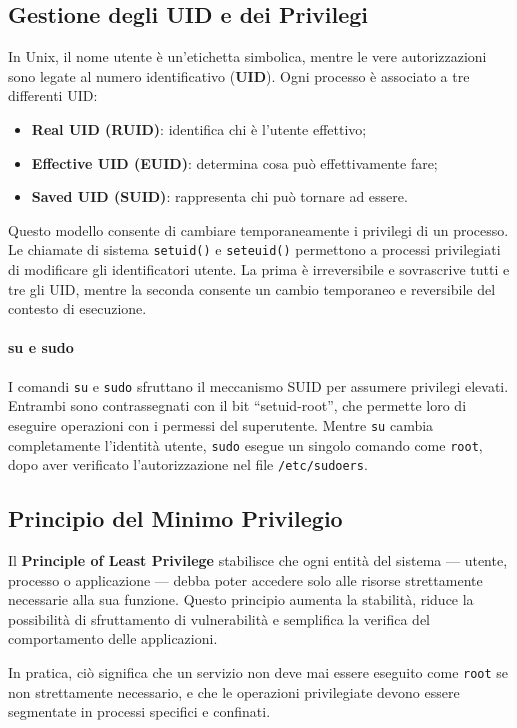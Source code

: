 \subsection{Gestione degli UID e dei Privilegi}
In Unix, il nome utente è un’etichetta simbolica, mentre le vere autorizzazioni sono legate al numero identificativo (\textbf{UID}).
Ogni processo è associato a tre differenti UID:
\begin{itemize}
  \item \textbf{Real UID (RUID)}: identifica chi è l’utente effettivo;
  \item \textbf{Effective UID (EUID)}: determina cosa può effettivamente fare;
  \item \textbf{Saved UID (SUID)}: rappresenta chi può tornare ad essere.
\end{itemize}

Questo modello consente di cambiare temporaneamente i privilegi di un processo.
Le chiamate di sistema \texttt{setuid()} e \texttt{seteuid()} permettono a processi privilegiati di modificare gli identificatori utente.
La prima è irreversibile e sovrascrive tutti e tre gli UID, mentre la seconda consente un cambio temporaneo e reversibile del contesto di esecuzione.

\paragraph{su e sudo}
I comandi \texttt{su} e \texttt{sudo} sfruttano il meccanismo SUID per assumere privilegi elevati.
Entrambi sono contrassegnati con il bit “setuid-root”, che permette loro di eseguire operazioni con i permessi del superutente.
Mentre \texttt{su} cambia completamente l’identità utente, \texttt{sudo} esegue un singolo comando come \texttt{root}, dopo aver verificato l’autorizzazione nel file \texttt{/etc/sudoers}.

\subsection{Principio del Minimo Privilegio}
Il \textbf{Principle of Least Privilege} stabilisce che ogni entità del sistema — utente, processo o applicazione — debba poter accedere solo alle risorse strettamente necessarie alla sua funzione.
Questo principio aumenta la stabilità, riduce la possibilità di sfruttamento di vulnerabilità e semplifica la verifica del comportamento delle applicazioni.

In pratica, ciò significa che un servizio non deve mai essere eseguito come \texttt{root} se non strettamente necessario, e che le operazioni privilegiate devono essere segmentate in processi specifici e confinati.

